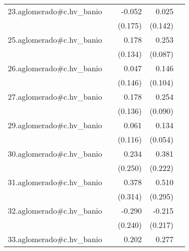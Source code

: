 {\begin{longtable}{l*{4}{D{.}{.}{-1}}}
\addlinespace
23.aglomerado#c.hv\_banio&                     &      -0.052         &       0.025         &                     \\
            &                     &     (0.175)         &     (0.142)         &                     \\
\addlinespace
25.aglomerado#c.hv\_banio&                     &       0.178         &       0.253\sym{**} &                     \\
            &                     &     (0.134)         &     (0.087)         &                     \\
\addlinespace
26.aglomerado#c.hv\_banio&                     &       0.047         &       0.146         &                     \\
            &                     &     (0.146)         &     (0.104)         &                     \\
\addlinespace
27.aglomerado#c.hv\_banio&                     &       0.178         &       0.254\sym{**} &                     \\
            &                     &     (0.136)         &     (0.090)         &                     \\
\addlinespace
29.aglomerado#c.hv\_banio&                     &       0.061         &       0.134\sym{*}  &                     \\
            &                     &     (0.116)         &     (0.054)         &                     \\
\addlinespace
30.aglomerado#c.hv\_banio&                     &       0.234         &       0.381         &                     \\
            &                     &     (0.250)         &     (0.222)         &                     \\
\addlinespace
31.aglomerado#c.hv\_banio&                     &       0.378         &       0.510         &                     \\
            &                     &     (0.314)         &     (0.295)         &                     \\
\addlinespace
32.aglomerado#c.hv\_banio&                     &      -0.290         &      -0.215         &                     \\
            &                     &     (0.240)         &     (0.217)         &                     \\
\addlinespace
33.aglomerado#c.hv\_banio&                     &       0.202         &       0.277\sym{***}&                     \\

\end{longtable}}
